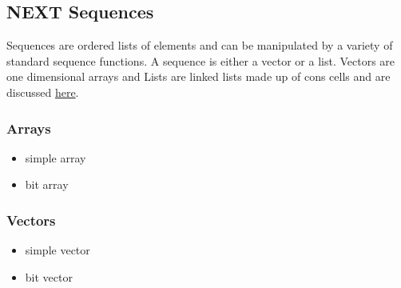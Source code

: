 \documentclass[11pt]{article}
\begin{document}
\subsection{{\bfseries\sffamily NEXT} Sequences}
\label{sec-5-2}
Sequences are ordered lists of elements and can be manipulated by a
variety of standard sequence functions. A sequence is either a
vector or a list. Vectors are one dimensional arrays and Lists are
linked lists made up of cons cells and are discussed \hyperref[sec-5-2-4]{here}.
\subsubsection{Arrays}
\label{sec-5-2-1}
\begin{itemize}
\item simple array
\item bit array
\end{itemize}
\subsubsection{Vectors}
\label{sec-5-2-2}
\begin{itemize}
\item simple vector
\item bit vector
\end{itemize}
\end{document}
